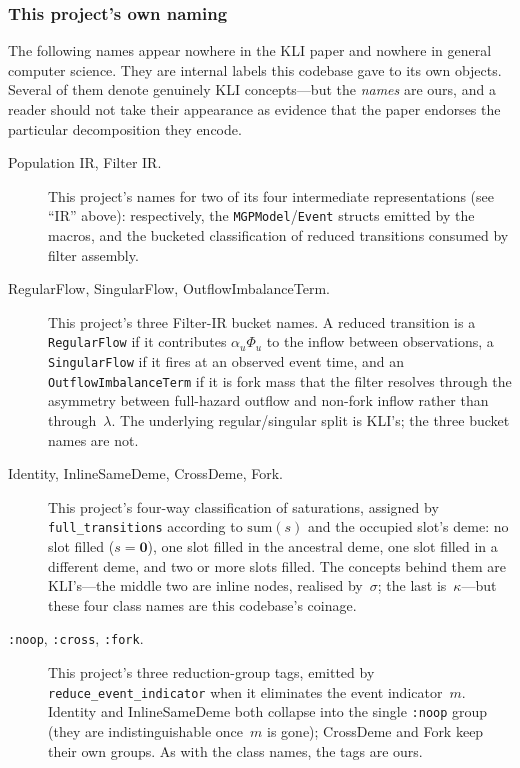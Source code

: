 \documentclass[11pt,leqno]{article}
\newcommand{\code}[1]{\texttt{#1}}
\theoremstyle{plain}
\theoremstyle{definition}
\begin{document}
\subsubsection{This project's own naming}

The following names appear nowhere in the KLI paper and nowhere in general
computer science.  They are internal labels this codebase gave to its own
objects.  Several of them denote genuinely KLI concepts---but the
\emph{names} are ours, and a reader should not take their appearance as
evidence that the paper endorses the particular decomposition they encode.

\begin{description}

\item[Population IR, Filter IR.]  This project's names for two of its four
  intermediate representations (see ``IR'' above): respectively, the
  \code{MGPModel}/\code{Event} structs emitted by the macros, and the
  bucketed classification of reduced transitions consumed by filter
  assembly.

\item[RegularFlow, SingularFlow, OutflowImbalanceTerm.]  This project's
  three Filter-IR bucket names.  A reduced transition is a
  \code{RegularFlow} if it contributes $\alpha_u \Phi_u$ to the inflow
  between observations, a \code{SingularFlow} if it fires at an observed
  event time, and an \code{OutflowImbalanceTerm} if it is fork mass that
  the filter resolves through the asymmetry between full-hazard outflow and
  non-fork inflow rather than through~$\lambda$.  The underlying
  regular/singular split is KLI's; the three bucket names are not.

\item[Identity, InlineSameDeme, CrossDeme, Fork.]  This project's four-way
  classification of saturations, assigned by \code{full\_transitions}
  according to $\mathrm{sum}(s)$ and the occupied slot's deme:
  no slot filled ($s = \mathbf{0}$), one slot filled in the ancestral
  deme, one slot filled in a different deme, and two or more slots filled.
  The concepts behind them are KLI's---the middle two are inline nodes,
  realised by~$\sigma$; the last is~$\kappa$---but these four class names
  are this codebase's coinage.

\item[\code{:noop}, \code{:cross}, \code{:fork}.]  This project's three
  reduction-group tags, emitted by \code{reduce\_event\_indicator} when it
  eliminates the event indicator~$m$.  Identity and InlineSameDeme both
  collapse into the single \code{:noop} group (they are indistinguishable
  once~$m$ is gone); CrossDeme and Fork keep their own groups.  As with the
  class names, the tags are ours.


\end{description}
\end{document}
